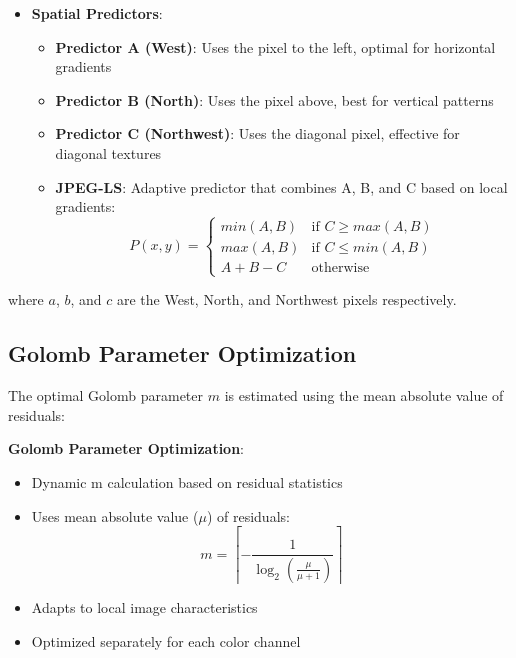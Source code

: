 \documentclass[a4paper,14pt]{article}
\begin{document}
\begin{itemize}
    \item \textbf{Spatial Predictors}:
    \begin{itemize}
        \item \textbf{Predictor A (West)}: Uses the pixel to the left, optimal for horizontal gradients
        \item \textbf{Predictor B (North)}: Uses the pixel above, best for vertical patterns
        \item \textbf{Predictor C (Northwest)}: Uses the diagonal pixel, effective for diagonal textures
        \item \textbf{JPEG-LS}: Adaptive predictor that combines A, B, and C based on local gradients:
        \begin{equation}
            P(x,y) = \begin{cases}
                min(A,B) & \text{if } C \geq max(A,B) \\
                max(A,B) & \text{if } C \leq min(A,B) \\
                A + B - C & \text{otherwise}
            \end{cases}
        \end{equation}
    \end{itemize}

  
\end{itemize}



where $a$, $b$, and $c$ are the West, North, and Northwest pixels respectively.

\subsection{Golomb Parameter Optimization}
The optimal Golomb parameter $m$ is estimated using the mean absolute value of residuals:

\textbf{Golomb Parameter Optimization}:
    \begin{itemize}
        \item Dynamic m calculation based on residual statistics
        \item Uses mean absolute value ($\mu$) of residuals:
        \begin{equation}
            m = \left\lceil -\frac{1}{\log_2(\frac{\mu}{\mu+1})} \right\rceil
        \end{equation}
        \item Adapts to local image characteristics
        \item Optimized separately for each color channel
    \end{itemize}
\end{document}
